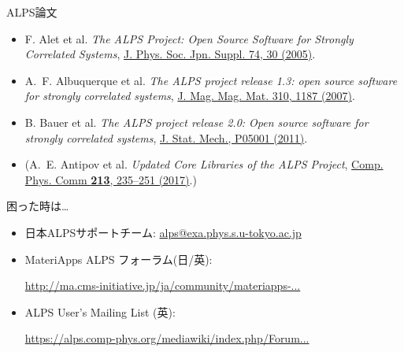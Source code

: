 \begin{frame}[t,fragile]{ALPS論文}
  \begin{itemize}
    \setlength{\itemsep}{1em}
  \item F. Alet et al. {\it The ALPS Project: Open Source Software for
    Strongly Correlated Systems}, \href{http://jpsj.ipap.jp/link?JPSJS/74S/30}{J. Phys. Soc. Jpn. Suppl. 74, 30 (2005)}.
  \item A.~F. Albuquerque et al. {\it The ALPS project release 1.3: open source software for strongly correlated systems}, \href{http://dx.doi.org/10.1016/j.jmmm.2006.10.304}{J. Mag. Mag. Mat. 310, 1187 (2007)}.
  \item B. Bauer et al. {\it The ALPS project release 2.0: Open source software for strongly correlated systems}, \href{http://iopscience.iop.org/1742-5468/2011/05/P05001}{J. Stat. Mech., P05001 (2011)}.
  \item (A.~E. Antipov et al. {\it Updated Core Libraries of the ALPS Project}, \href{http://dx.doi.org/10.1016/j.cpc.2016.12.009}{Comp. Phys. Comm {\bf 213}, 235--251 (2017)}.)
  \end{itemize}
\end{frame}

\begin{frame}[t,fragile]{困った時は…}
  \begin{itemize}
    \setlength{\itemsep}{1em}
  \item 日本ALPSサポートチーム: {\href{mailto:alps@exa.phys.s.u-tokyo.ac.jp}{alps@exa.phys.s.u-tokyo.ac.jp}}
  \item MateriApps ALPS フォーラム(日/英):

    {\footnotesize \href{http://ma.cms-initiative.jp/ja/community/materiapps-messageboard/alps}{http://ma.cms-initiative.jp/ja/community/materiapps-...}}
  \item ALPS User's Mailing List (英):

    {\footnotesize \href{https://alps.comp-phys.org/mediawiki/index.php/Forum:Overview}{https://alps.comp-phys.org/mediawiki/index.php/Forum...}}
  \end{itemize}
\end{frame}

